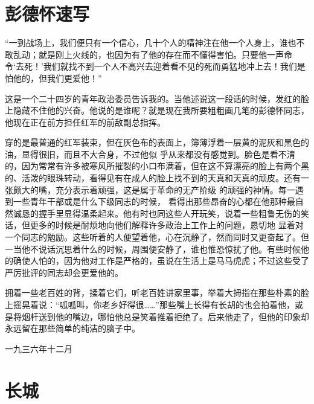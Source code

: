 \documentclass[12pt,UTF-8,openany]{ctexbook}
\begin{document}
\chapter{彭德怀速写}

\begin{large}
    
    “一到战场上，我们便只有一个信心，几十个人的精神注在他一个人身上，谁也不敢乱动；就是刚上火线的，也因为有了他的存在而不懂得害怕。只要他一声命令‘去死！’我们就找不到一个人不高兴去迎着看不见的死而勇猛地冲上去！我们是怕他的，但我们更爱他！”
    
    这是一个二十四岁的青年政治委员告诉我的。当他述说这一段话的时候，发红的脸上隐藏不住他的兴奋。他说的是谁呢？就是现在我所要粗粗画几笔的彭德怀同志，他现在正在前方担任红军的前敌副总指挥。
    
    穿的是最普通的红军装束，但在灰色布的表面上，簿薄浮着一层黄的泥灰和黑色的油，显得很旧，而且不大合身，不过他似 乎从来都没有感觉到。脸色是看不清的，因为常常有许多被寒风所摧裂的小口布满着，但在这不算漂亮的脸上有两个黑的、活泼的眼珠转动，看得见有在成人的脸上找不到的天真和天真的顽皮。还有一张颇大的嘴，充分表示着顽强，这是属于革命的无产阶级 的顽强的神情。每一遇到一些青年干部或是什么下级同志的时候， 看得出那些昂奋的心都在他那种最自然诚恳的握手里显得温柔起来。他有时也同这些人开玩笑，说着一些粗鲁无伤的笑话，但更多的时候是耐烦地向他们解释许多政治上工作上的问题，恳切地 显着对一个同志的勉励。这些听着的人便望着他，心在沉静了，然而同时又更奋起了。但一当他不说话沉思着什么的时候，周围便安静了，谁也惟恐惊扰了他。有些时候他的确使人怕的，因为他对工作是严格的，虽说在生活上是马马虎虎；不过这些受了严厉批评的同志却会更爱他的。
    
    拥着一些老百姓的背，揉着它们，听老百姓讲家里事，举着大拇指在那些朴素的脸上摇晃着说：“呱呱叫，你老乡好得很……”那些嘴上长得有长胡的也会拍着他，或是将烟杆送到他的嘴边，哪怕他总是笑着推着拒绝了。后来他走了，但他的印象却永远留在那些简单的纯洁的脑子中。
    
    \hfill 一九三六年十二月
    
\end{large}



\chapter{长城}
\end{document}
